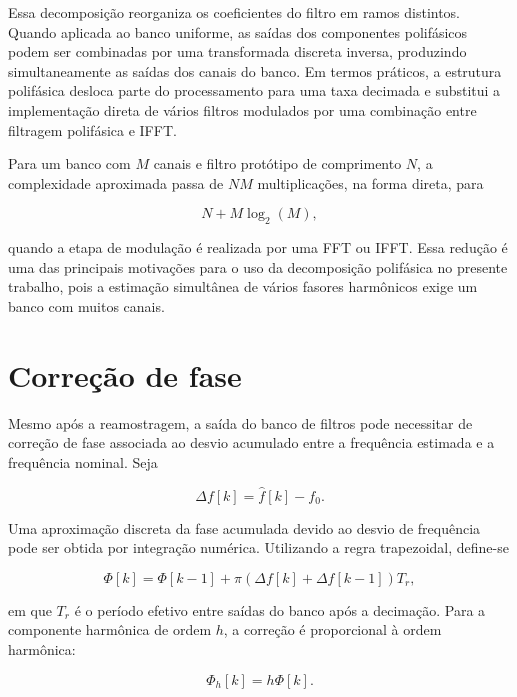 Essa decomposição reorganiza os coeficientes do filtro em ramos distintos. Quando aplicada ao banco uniforme, as saídas dos componentes polifásicos podem ser combinadas por uma transformada discreta inversa, produzindo simultaneamente as saídas dos canais do banco. Em termos práticos, a estrutura polifásica desloca parte do processamento para uma taxa decimada e substitui a implementação direta de vários filtros modulados por uma combinação entre filtragem polifásica e IFFT.

Para um banco com $M$ canais e filtro protótipo de comprimento $N$, a complexidade aproximada passa de $NM$ multiplicações, na forma direta, para

\begin{equation}
N + M\log_2(M),
\label{eq:complexidade_polifasica}
\end{equation}

\noindent quando a etapa de modulação é realizada por uma FFT ou IFFT. Essa redução é uma das principais motivações para o uso da decomposição polifásica no presente trabalho, pois a estimação simultânea de vários fasores harmônicos exige um banco com muitos canais.

\section{Correção de fase}

Mesmo após a reamostragem, a saída do banco de filtros pode necessitar de correção de fase associada ao desvio acumulado entre a frequência estimada e a frequência nominal. Seja

\begin{equation}
\Delta f[k] = \hat{f}[k] - f_0.
\label{eq:desvio_freq}
\end{equation}

Uma aproximação discreta da fase acumulada devido ao desvio de frequência pode ser obtida por integração numérica. Utilizando a regra trapezoidal, define-se

\begin{equation}
\Phi[k] = \Phi[k-1] + \pi\left(\Delta f[k] + \Delta f[k-1]\right)T_r,
\label{eq:correcao_fase_fundamental}
\end{equation}

\noindent em que $T_r$ é o período efetivo entre saídas do banco após a decimação. Para a componente harmônica de ordem $h$, a correção é proporcional à ordem harmônica:

\begin{equation}
\Phi_h[k] = h\Phi[k].
\label{eq:correcao_fase_harmonico}
\end{equation}

